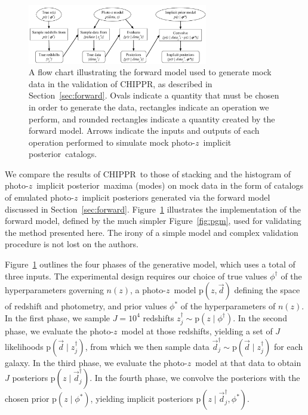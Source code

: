 \documentclass[iop]{emulateapj}
\newcommand{\todo}[3]{{\color{#2}\emph{#1}: #3}}
\newcommand{\que}[1]{\todo{Question}{cyan}{#1}}
\newcommand{\Sect}[1]{Section~\ref{#1}}
\newcommand{\Fig}[1]{Figure~\ref{#1}}
\newcommand{\project}[1]{\textsc{#1}}
\newcommand{\Chippr}{\project{CHIPPR}}%
\newcommand{\data}{\ensuremath{\vec{d}}}%
\newcommand{\pr}[1]{\ensuremath{\mathrm{p}(#1)}}%
\newcommand{\gvn}{\mid}%
\newcommand{\pz}{photo-$z$}
\newcommand{\pzip}{\pz\ implicit posterior}
\newcommand{\nz}{$n(z)$}
\begin{document}
\begin{figure}
	\begin{center}
		\includegraphics[width=0.7\textwidth]{figures/chippr/flowchart.pdf}
		\caption{
			A flow chart illustrating the forward model used to generate mock data in the validation of \Chippr, as described in \Sect{sec:forward}.
			Ovals indicate a quantity that must be chosen in order to generate the data, rectangles indicate an operation we perform, and rounded rectangles indicate a quantity created by the forward model.
			Arrows indicate the inputs and outputs of each operation performed to simulate mock \pzip\ catalogs.
		}
		\label{fig:flowchart}
	\end{center}
\end{figure}

We compare the results of \Chippr\ to those of stacking and the histogram of \pzip\ maxima (modes) on mock data in the form of catalogs of emulated \pzip s generated via the forward model discussed in \Sect{sec:forward}.
\Fig{fig:flowchart} illustrates the implementation of the forward model, defined by the much simpler \Fig{fig:pgm}, used for validating the method presented here.
The irony of a simple model and complex validation procedure is not lost on the authors.

\Fig{fig:flowchart} outlines the four phases of the generative model, which uses a total of three inputs.
The experimental design requires our choice of true values $\phi^{\dagger}$ of the hyperparameters governing \nz, a \pz\ model $\pr{z, \data}$ defining the space of redshift and photometry, and prior values $\phi^{*}$ of the hyperparameters of \nz.
In the first phase, we sample $J = 10^{4}$ redshifts $z_{j}^{\dagger} \sim \pr{z \gvn \phi^{\dagger}}$.
In the second phase, we evaluate the \pz\ model at those redshifts, yielding a set of $J$ likelihoods $\pr{\data \gvn z_{j}^{\dagger}}$, from which we then sample data $\data_{j}^{\dagger} \sim \pr{\data \gvn z_{j}^{\dagger}}$ for each galaxy.
In the third phase, we evaluate the \pz\ model at that data to obtain $J$ posteriors $\pr{z \gvn \data_{j}^{\dagger}}$.
In the fourth phase, we convolve the posteriors with the chosen prior $\pr{z \gvn \phi^{*}}$, yielding implicit posteriors $\pr{z \gvn \data_{j}^{\dagger}, \phi^{*}}$.
\end{document}
